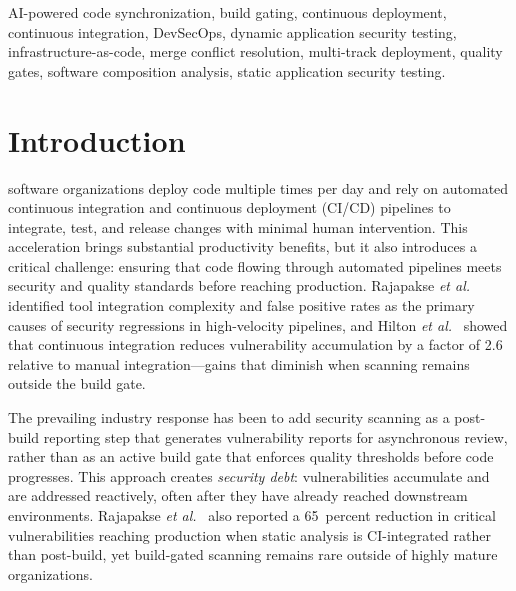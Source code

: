 \documentclass{ieeeaccess}
\begin{document}
\begin{keywords}
AI-powered code synchronization, build gating, continuous deployment, continuous integration, DevSecOps, dynamic application security testing, infrastructure-as-code, merge conflict resolution, multi-track deployment, quality gates, software composition analysis, static application security testing.
\end{keywords}

\titlepgskip=-21pt

\maketitle

\section{Introduction}
\label{sec:introduction}
 software organizations deploy code multiple times per day and rely on automated continuous integration and continuous deployment (CI/CD) pipelines to integrate, test, and release changes with minimal human intervention. This acceleration brings substantial productivity benefits, but it also introduces a critical challenge: ensuring that code flowing through automated pipelines meets security and quality standards before reaching production. Rajapakse \emph{et al.}~\cite{rajapakse2022devsecops} identified tool integration complexity and false positive rates as the primary causes of security regressions in high-velocity pipelines, and Hilton \emph{et al.}~\cite{hilton2016usage} showed that continuous integration reduces vulnerability accumulation by a factor of 2.6 relative to manual integration---gains that diminish when scanning remains outside the build gate.

The prevailing industry response has been to add security scanning as a post-build reporting step that generates vulnerability reports for asynchronous review, rather than as an active build gate that enforces quality thresholds before code progresses. This approach creates \emph{security debt}: vulnerabilities accumulate and are addressed reactively, often after they have already reached downstream environments. Rajapakse \emph{et al.}~\cite{rajapakse2022devsecops} also reported a 65~percent reduction in critical vulnerabilities reaching production when static analysis is CI-integrated rather than post-build, yet build-gated scanning remains rare outside of highly mature organizations.
\end{document}
